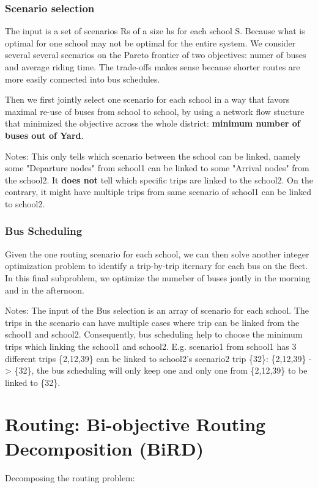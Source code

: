 \documentclass[11pt]{article}
\begin{document}
\subsubsection{Scenario selection}
\label{sec:orgc733fec}

The input is a set of scenarios Rs of a size hs for each school S. Because what
is optimal for one school may not be optimal for the entire system. We consider
several several scenarios on the Pareto frontier of two objectives: numer of
buses and average riding time. The trade-offs makes sense because shorter routes
are more easily connected into bus schedules.

Then we first jointly select one scenario for each school in a way that favors
maximal re-use of buses from school to school, by using a network flow stucture
that minimized the objective across the whole district: \textbf{\textbf{minimum number of buses
out of Yard}}.

Notes:
This only tells which scenario between the school can be linked, namely some
"Departure nodes" from school1 can be linked to some "Arrival nodes" from the
school2. It \textbf{\textbf{does not}} tell which specific trips are linked to the school2.
On the contrary, it might have multiple trips from same scenario of school1 can
be linked to school2.

\subsubsection{Bus Scheduling}
\label{sec:orgd17de5d}

Given the one routing scenario for each school, we can then solve another
integer optimization problem to identify a trip-by-trip iternary for each bus on
the fleet. In this final subproblem, we optimize the numeber of buses jontly in
the morning and in the afternoon.

Notes:
The input of the Bus selection is an array of scenario for each school.
The trips in the scenario can have multiple cases where trip can be linked from
the school1 and school2. Consequently, bus scheduling help to choose the minimum
trips which linking the school1 and school2. E.g. scenario1 from school1 has 3
different trips \{2,12,39\} can be linked to school2's scenario2 trip \{32\}:
\{2,12,39\} -> \{32\}, the bus scheduling will only keep one and only one from
\{2,12,39\} to be linked to \{32\}.


\section{Routing: Bi-objective Routing Decomposition (BiRD)}
\label{sec:orgf83542a}
Decomposing the routing problem:
\end{document}
